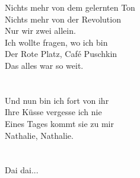 {{Nichts mehr von dem gelernten Ton\\
Nichts mehr von der Revolution\\
Nur wir zwei allein.\\
Ich wollte fragen, wo ich bin\\
Der Rote Platz, Café Puschkin\\
Das alles war so weit.}\\
\\\noindent\vbox{~\\
Und nun bin ich fort von ihr\\
Ihre K{\"u}sse vergesse ich nie\\
Eines Tages kommt sie zu mir\\
Nathalie, Nathalie.}\\
\\\noindent\vbox{~\\
Dai dai...}
}


